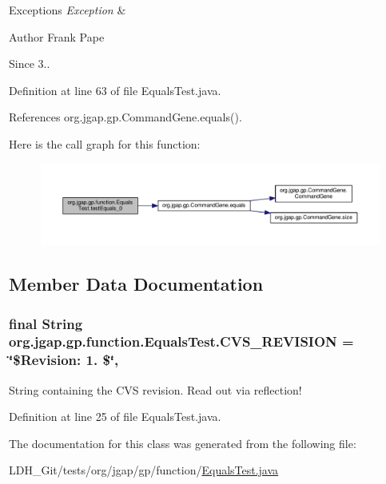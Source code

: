 \begin{DoxyExceptions}{Exceptions}
{\em Exception} & \\
\hline
\end{DoxyExceptions}
\begin{DoxyAuthor}{Author}
Frank Pape 
\end{DoxyAuthor}
\begin{DoxySince}{Since}
3.. 
\end{DoxySince}


Definition at line 63 of file Equals\-Test.\-java.



References org.\-jgap.\-gp.\-Command\-Gene.\-equals().



Here is the call graph for this function\-:
\nopagebreak
\begin{figure}[H]
\begin{center}
\leavevmode
\includegraphics[width=350pt]{classorg_1_1jgap_1_1gp_1_1function_1_1_equals_test_ae696985de7dcbb2e034e7c1634e2a1ee_cgraph}
\end{center}
\end{figure}




\subsection{Member Data Documentation}
\hypertarget{classorg_1_1jgap_1_1gp_1_1function_1_1_equals_test_ac12eefe89a387a89ebca396433e84525}{
\subsubsection[{C\-V\-S\-\_\-\-R\-E\-V\-I\-S\-I\-O\-N}]{\setlength{\rightskip}{0pt plus 5cm}final String org.\-jgap.\-gp.\-function.\-Equals\-Test.\-C\-V\-S\-\_\-\-R\-E\-V\-I\-S\-I\-O\-N = \char`\"{}\$Revision\-: 1. \$\char`\"{}\hspace{0.3cm}{\ttfamily [static]}, {\ttfamily [private]}}}\label{classorg_1_1jgap_1_1gp_1_1function_1_1_equals_test_ac12eefe89a387a89ebca396433e84525}
String containing the C\-V\-S revision. Read out via reflection! 

Definition at line 25 of file Equals\-Test.\-java.



The documentation for this class was generated from the following file\-:\begin{DoxyCompactItemize}
\item 
L\-D\-H\-\_\-\-Git/tests/org/jgap/gp/function/\hyperlink{_equals_test_8java}{Equals\-Test.\-java}\end{DoxyCompactItemize}
